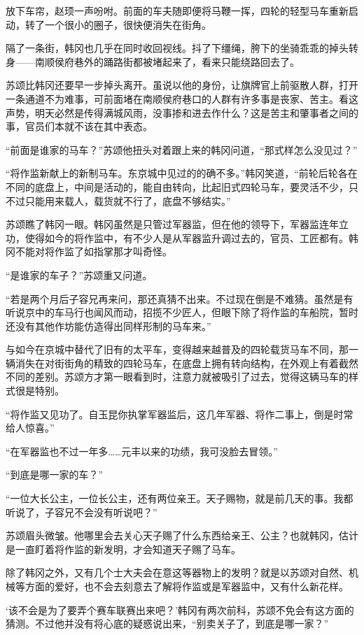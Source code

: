 放下车帘，赵顼一声吩咐。前面的车夫随即便将马鞭一挥，四轮的轻型马车重新启动，转了一个很小的圈子，很快便消失在街角。

隔了一条街，韩冈也几乎在同时收回视线。抖了下缰绳，胯下的坐骑乖乖的掉头转身——南顺侯府巷外的踊路街都被堵起来了，看来只能绕路回去了。

苏颂比韩冈还要早一步掉头离开。虽说以他的身份，让旗牌官上前驱散人群，打开一条通道不为难事，可前面堵在南顺侯府巷口的人群有许多事是丧家、苦主。看这声势，明天必然是传得满城风雨，没事掺和进去作什么？这是苦主和肇事者之间的事，官员们本就不该在其中表态。

“前面是谁家的马车？”苏颂他扭头对着跟上来的韩冈问道，“那式样怎么没见过？”

“将作监新献上的新制马车。东京城中见过的的确不多。”韩冈笑道，“前轮后轮各在不同的底盘上，中间是活动的，能自由转向，比起旧式四轮马车，要灵活不少，只不过只能用来载人，载货就不行了，底盘不够结实。”

苏颂瞧了韩冈一眼。韩冈虽然是只管过军器监，但在他的领导下，军器监连年立功，使得如今的将作监中，有不少人是从军器监升调过去的，官员、工匠都有。韩冈不能对将作监了如指掌那才叫奇怪。

“是谁家的车子？”苏颂重又问道。

“若是两个月后子容兄再来问，那还真猜不出来。不过现在倒是不难猜。虽然是有听说京中的车马行也闻风而动，招揽不少匠人，但眼下除了将作监的车船院，暂时还没有其他作坊能仿造得出同样形制的马车来。”

与如今在京城中替代了旧有的太平车，变得越来越普及的四轮载货马车不同，那一辆消失在对街街角的精致的四轮马车，在底盘上拥有转向结构，在外观上有着截然不同的差别。苏颂方才第一眼看到时，注意力就被吸引了过去，觉得这辆马车的样式很是特别。

“将作监又见功了。自玉昆你执掌军器监后，这几年军器、将作二事上，倒是时常给人惊喜。”

“在军器监也不过一年多……元丰以来的功绩，我可没脸去冒领。”

“到底是哪一家的车？”

“一位大长公主，一位长公主，还有两位亲王。天子赐物，就是前几天的事。我都听说了，子容兄不会没有听说吧？”

苏颂眉头微皱。他哪里会去关心天子赐了什么东西给亲王、公主？也就韩冈，估计是一直盯着将作监的新发明，才会知道天子赐了马车。

除了韩冈之外，又有几个士大夫会在意这等器物上的发明？就是以苏颂对自然、机械等方面的爱好，也不会去刻意去了解将作监或是军器监中，又有什么新花样。

‘该不会是为了要弄个赛车联赛出来吧？’韩冈有两次前科，苏颂不免会有这方面的猜测。不过他并没有将心底的疑惑说出来，“别卖关子了，到底是哪一家？”
